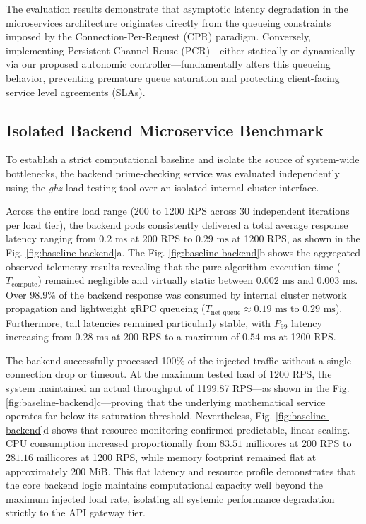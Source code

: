 \documentclass{ieeeaccess}
\begin{document}
The evaluation results demonstrate that asymptotic latency degradation in the microservices architecture originates directly from the queueing constraints imposed by the Connection-Per-Request (CPR) paradigm. Conversely, implementing Persistent Channel Reuse (PCR)—either statically or dynamically via our proposed autonomic controller—fundamentally alters this queueing behavior, preventing premature queue saturation and protecting client-facing service level agreements (SLAs).

\subsection{Isolated Backend Microservice Benchmark}
\label{sec5.1}

To establish a strict computational baseline and isolate the source of system-wide bottlenecks, the backend prime-checking service was evaluated independently using the \textit{ghz} load testing tool over an isolated internal cluster interface.

Across the entire load range (200 to 1200 RPS across 30 independent iterations per load tier), the backend pods consistently delivered a total average response latency ranging from $0.2\text{ ms}$ at 200 RPS to $0.29\text{ ms}$ at 1200 RPS, as shown in the Fig. \ref{fig:baseline-backend}a. The Fig. \ref{fig:baseline-backend}b shows the aggregated observed telemetry results revealing that the pure algorithm execution time ($T_{\text{compute}}$) remained negligible and virtually static between $0.002\text{ ms}$ and $0.003\text{ ms}$. Over 98.9\% of the backend response was consumed by internal cluster network propagation and lightweight gRPC queueing ($T_{\text{net\_queue}} \approx 0.19\text{ ms } \text{to } 0.29\text{ ms}$). Furthermore, tail latencies remained particularly stable, with $P_{99}$ latency increasing from $0.28\text{ ms}$ at 200 RPS to a maximum of $0.54\text{ ms}$ at 1200 RPS.

The backend successfully processed 100\% of the injected traffic without a single connection drop or timeout. At the maximum tested load of 1200 RPS, the system maintained an actual throughput of 1199.87 RPS—as shown in the Fig. \ref{fig:baseline-backend}c—proving that the underlying mathematical service operates far below its saturation threshold. Nevertheless, Fig. \ref{fig:baseline-backend}d shows that resource monitoring confirmed predictable, linear scaling. CPU consumption increased proportionally from $83.51\text{ millicores}$ at 200 RPS to $281.16\text{ millicores}$ at 1200 RPS, while memory footprint remained flat at approximately $200\text{ MiB}$. This flat latency and resource profile demonstrates that the core backend logic maintains computational capacity well beyond the maximum injected load rate, isolating all systemic performance degradation strictly to the API gateway tier.
\end{document}
